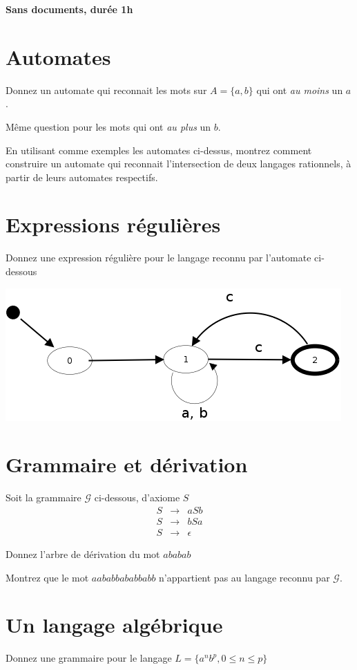 \documentclass[twoside,11pt]{article}
\begin{document}
\maketitle

\textbf{Sans documents, durée 1h}



\section{Automates}

\Q Donnez un automate qui reconnait les mots sur $A  = \{ a, b \}$ qui ont \emph{au moins} un $a$.

\Q Même question pour les mots qui ont \emph{au plus} un $b$.

\Q En utilisant comme exemples les automates ci-dessus, montrez 
comment construire un automate qui reconnait l'intersection de deux
langages rationnels, à partir de leurs automates respectifs.



\section{Expressions régulières}

Donnez une expression régulière pour le langage reconnu par l'automate 
ci-dessous \begin{center}
\includegraphics[width=0.5\linewidth]{../dia/auto-ds-rattrapage}
\end{center}

\section{Grammaire et dérivation}

Soit la grammaire $\mathcal{G}$ ci-dessous, d'axiome $S$ 
$$\begin{array}{rcl}
S & \rightarrow &a S b \\
S & \rightarrow & b S a  \\
S & \rightarrow & \epsilon 
\end{array}
$$

\Q Donnez l'arbre de dérivation du mot $ababab$

\Q Montrez que le mot $aababbababbabb$ n'appartient pas au langage
reconnu par   $\mathcal{G}$.

\section{Un langage algébrique}

\Q Donnez une grammaire pour le langage
$ L = \{ a^n b^p, 0 \leq n \leq p \}$
\end{document}

